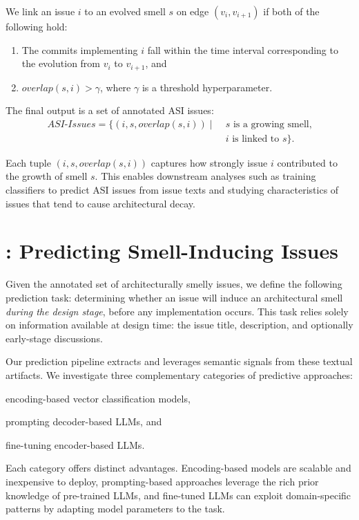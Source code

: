 We link an issue $i$ to an evolved smell $s$ on edge $(v_i, v_{i+1})$ if both of the following hold:
\begin{enumerate}[leftmargin=*]
    \item The commits implementing $i$ fall within the time interval corresponding to the evolution from $v_i$ to $v_{i+1}$, and
    \item $\mathit{overlap}(s, i) > \gamma$, where $\gamma$ is a threshold hyperparameter.
\end{enumerate}


The final output is a set of annotated \ac{ASI} issues:
\begin{align}
    \textit{ASI-Issues} =
    \{ (i, s, \mathit{overlap}(s,i)) \mid\;
     & s \text{ is a growing smell,} \nonumber \\
     & i \text{ is linked to } s \}.
\end{align}

Each tuple $(i, s, \mathit{overlap}(s,i))$ captures how strongly issue $i$ contributed to the growth of smell $s$.
This enables downstream analyses such as training classifiers to predict \acl{ASI} issues from issue texts
and studying characteristics of issues that tend to cause architectural decay.











\section{\approach: Predicting Smell-Inducing Issues}

Given the annotated set of architecturally smelly issues, we define the following prediction task:
determining whether an issue will induce an architectural smell \emph{during the design stage}, before any implementation occurs.
This task relies solely on information available at design time: the issue title, description, and optionally early-stage discussions.

Our prediction pipeline extracts and leverages semantic signals from these textual artifacts.
We investigate three complementary categories of predictive approaches:
\begin{enumerate*}[label=(\roman*)]
    \item encoding-based vector classification models,
    \item prompting decoder-based \acp{LLM}, and
    \item fine-tuning encoder-based \acp{LLM}.
\end{enumerate*}
Each category offers distinct advantages.
Encoding-based models are scalable and inexpensive to deploy, prompting-based approaches leverage the rich prior knowledge of pre-trained \acp{LLM}, and fine-tuned \acp{LLM} can exploit domain-specific patterns by adapting model parameters to the task.


